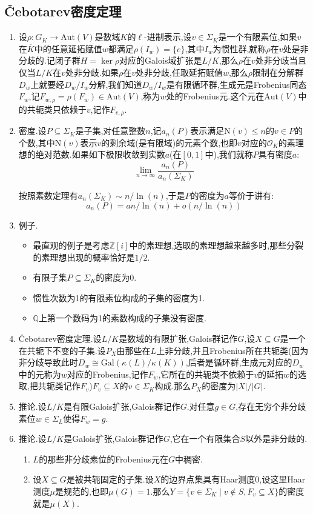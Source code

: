 \subsection{\v{C}ebotarev密度定理}


\begin{enumerate}
	\item 设$\rho:G_K\to\mathrm{Aut}(V)$是数域$K$的$\ell$-进制表示,设$v\in\Sigma_K$是一个有限素位,如果$v$在$\overline{K}$中的任意延拓赋值$w$都满足$\rho(I_w)=\{e\}$,其中$I_w$为惯性群,就称$\rho$在$v$处是非分歧的.记闭子群$H=\ker\rho$对应的Galois域扩张是$L/K$,那么$\rho$在$v$处非分歧当且仅当$L/K$在$v$处非分歧.如果$\rho$在$v$处非分歧,任取延拓赋值$w$,那么$\rho$限制在分解群$D_w$上就要经$D_w/I_w$分解,我们知道$D_w/I_w$是有限循环群,生成元是Frobenius同态$F_w$,记$F_{w,\rho}=\rho(F_w)\in\mathrm{Aut}(V)$,称为$w$处的Frobenius元.这个元在$\mathrm{Aut}(V)$中的共轭类只依赖于$v$,记作$F_{v,\rho}$.
	\item 密度.设$P\subseteq\Sigma_K$是子集,对任意整数$n$,记$a_n(P)$表示满足$\mathrm{N}(v)\le n$的$v\in P$的个数,其中$\mathrm{N}(v)$表示$v$的剩余域(是有限域)的元素个数,也即$v$对应的$\mathscr{O}_K$的素理想的绝对范数.如果如下极限收敛到实数$a$(在$[0,1]$中),我们就称$P$具有密度$a$:
	$$\lim\limits_{n\to\infty}\frac{a_n(P)}{a_n(\Sigma_K)}$$
	
	按照素数定理有$a_n(\Sigma_K)\sim n/\ln(n)$,于是$P$的密度为$a$等价于讲有:
	$$a_n(P)=an/\ln(n)+o(n/\ln(n))$$
	\item 例子.
	\begin{itemize}
		\item 最直观的例子是考虑$\mathbb{Z}[i]$中的素理想,选取的素理想越来越多时,那些分裂的素理想出现的概率恰好是$1/2$.
		\item 有限子集$P\subseteq\Sigma_K$的密度为0.
		\item 惯性次数为1的有限素位构成的子集的密度为1.
		\item $\mathbb{Q}$上第一个数码为1的素数构成的子集没有密度.
	\end{itemize}
	\item \v{C}ebotarev密度定理.设$L/K$是数域的有限扩张,Galois群记作$G$,设$X\subseteq G$是一个在共轭下不变的子集.设$P_X$由那些在$L$上非分歧,并且Frobenius所在共轭类(因为非分歧导致此时$D_w\cong\mathrm{Gal}(\kappa(L)/\kappa(K))$,后者是循环群,生成元对应的$D_w$中的元称为$w$对应的Frobenius,记作$F_w$,它所在的共轭类不依赖于$v$的延拓$w$的选取,把共轭类记作$F_v$)$F_v\subseteq X$的$v\in\Sigma_K$构成.那么$P_X$的密度为$|X|/|G|$.
	\item 推论.设$L/K$是有限Galois扩张,Galois群记作$G$.对任意$g\in G$,存在无穷个非分歧素位$w\in\Sigma_L$使得$F_w=g$.
	\item 推论.设$L/K$是Galois扩张,Galois群记作$G$,它在一个有限集合$S$以外是非分歧的.
	\begin{enumerate}[(1)]
		\item $L$的那些非分歧素位的Frobenius元在$G$中稠密.
		\item 设$X\subseteq G$是被共轭固定的子集.设$X$的边界点集具有Haar测度0,设这里Haar测度$\mu$是规范的,也即$\mu(G)=1$.那么$Y=\{v\in\Sigma_K\mid v\not\in S,F_v\subseteq X\}$的密度就是$\mu(X)$.
	\end{enumerate}
\end{enumerate}
